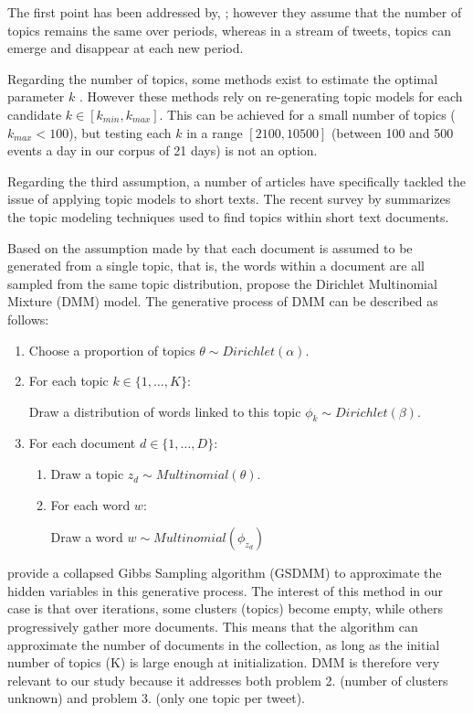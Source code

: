 	The first point has been addressed by, \citet{blei_dynamic_2006}; however they assume that the number of topics remains the same over periods, whereas in a stream of tweets, topics can emerge and disappear at each new period.
	
	Regarding the number of topics, some methods exist to estimate the optimal parameter $k$  \citep{brunet_metagenes_2004,arun_finding_2010,greene_how_2014}. However these methods rely on re-generating topic models for each candidate $k \in [k_{min}, k_{max}]$. This can be achieved for a small number of topics ($k_{max} < 100$), but testing each $k$ in a range $[2100, 10500]$ (between 100 and 500 events a day in our corpus of 21 days) is not an option. 
	
	Regarding the third assumption, a number of articles have specifically tackled the issue of applying topic models to short texts. The recent survey by \citet{likhitha975detailed} summarizes the topic modeling techniques used to find topics within short text documents.
    
    Based on the assumption made by \citet{nigam2000text} that each document is assumed to be generated from a single topic, that is, the words within a document are all sampled from the same topic distribution, \citet{yin_dirichlet_2014} propose the Dirichlet Multinomial Mixture (DMM) model. The generative process of DMM can be described as follows: 
    \begin{center}
        	\begin{enumerate}
	 	\item Choose a proportion of topics $\theta \sim Dirichlet(\alpha)$.
	 	\item For each topic $k \in \lbrace1,\ldots,K\rbrace$:
	 	 
			Draw a distribution of words linked to this topic $\phi_k \sim Dirichlet(\beta)$.
		\item For each document $d \in \lbrace1,\ldots,D\rbrace$:
		\begin{enumerate}
		    \item Draw a topic $z_d \sim Multinomial(\theta)$.
		    \item For each word $w$:
		    
		    Draw a word $w \sim Multinomial(\phi_{z_d})$
		    
		\end{enumerate}	 	  
	 \end{enumerate}
    \end{center}

\citet{yin_dirichlet_2014} provide a collapsed Gibbs Sampling algorithm (GSDMM) to approximate the hidden variables in this generative process. The interest of this method in our case is that over iterations, some clusters (topics) become empty, while others progressively gather more documents. This means that the algorithm can approximate the number of documents in the collection, as long as the initial number of topics (K) is large enough at initialization. DMM is therefore very relevant to our study because it addresses both problem 2. (number of clusters unknown) and problem 3. (only one topic per tweet).

